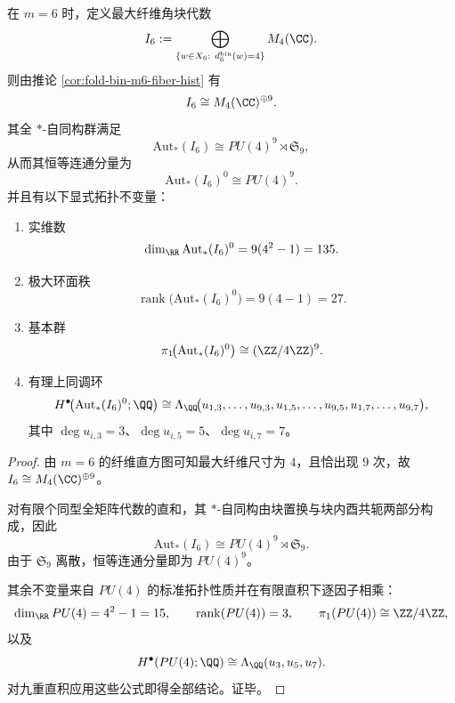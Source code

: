 \begin{theorem}\label{thm:conclusion-foldbin-window6-maxfiber-corner-aut}
在 \(m=6\) 时，定义最大纤维角块代数
\[
I_6:=
\bigoplus_{\{w\in X_6:\ d_6^{\mathrm{bin}}(w)=4\}} M_4(\CC).
\]
则由推论 \ref{cor:fold-bin-m6-fiber-hist} 有
\[
I_6\cong M_4(\CC)^{\oplus 9}.
\]
其全 \(\ast\)-自同构群满足
\[
\mathrm{Aut}_{\ast}(I_6)\cong PU(4)^9\rtimes \mathfrak S_9,
\]
从而其恒等连通分量为
\[
\mathrm{Aut}_{\ast}(I_6)^0\cong PU(4)^9.
\]
并且有以下显式拓扑不变量：
\begin{enumerate}
  \item 实维数
  \[
  \dim_{\RR}\mathrm{Aut}_{\ast}(I_6)^0=9(4^2-1)=135.
  \]
  \item 极大环面秩
  \[
  \operatorname{rank}\bigl(\mathrm{Aut}_{\ast}(I_6)^0\bigr)=9(4-1)=27.
  \]
  \item 基本群
  \[
  \pi_1\!\bigl(\mathrm{Aut}_{\ast}(I_6)^0\bigr)\cong (\ZZ/4\ZZ)^9.
  \]
  \item 有理上同调环
  \[
  H^\bullet\!\bigl(\mathrm{Aut}_{\ast}(I_6)^0;\QQ\bigr)
  \cong
  \Lambda_{\QQ}\!\bigl(
  u_{1,3},\dots,u_{9,3},
  u_{1,5},\dots,u_{9,5},
  u_{1,7},\dots,u_{9,7}
  \bigr),
  \]
  其中 \(\deg u_{i,3}=3\)、\(\deg u_{i,5}=5\)、\(\deg u_{i,7}=7\)。
\end{enumerate}
\end{theorem}
\begin{proof}
由 \(m=6\) 的纤维直方图可知最大纤维尺寸为 \(4\)，且恰出现 \(9\) 次，故
\(
I_6\cong M_4(\CC)^{\oplus 9}
\)。

对有限个同型全矩阵代数的直和，其 \(\ast\)-自同构由块置换与块内酉共轭两部分构成，因此
\[
\mathrm{Aut}_{\ast}(I_6)\cong PU(4)^9\rtimes \mathfrak S_9.
\]
由于 \(\mathfrak S_9\) 离散，恒等连通分量即为 \(PU(4)^9\)。

其余不变量来自 \(PU(4)\) 的标准拓扑性质并在有限直积下逐因子相乘：
\[
\dim_{\RR}PU(4)=4^2-1=15,\qquad
\operatorname{rank}(PU(4))=3,\qquad
\pi_1(PU(4))\cong \ZZ/4\ZZ,
\]
以及
\[
H^\bullet(PU(4);\QQ)\cong \Lambda_{\QQ}(u_3,u_5,u_7).
\]
对九重直积应用这些公式即得全部结论。证毕。
\end{proof}

